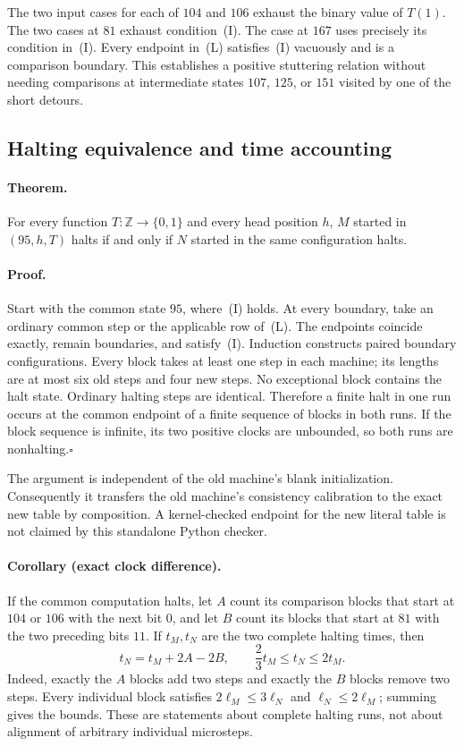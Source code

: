 The two input cases for each of $104$ and $106$ exhaust the binary value
of $T(1)$.  The two cases at $81$ exhaust condition~(I).  The case at $167$
uses precisely its condition in~(I).  Every endpoint in~(L) satisfies~(I)
vacuously and is a comparison boundary.  This establishes a positive
stuttering relation without needing comparisons at intermediate states
$107$, $125$, or $151$ visited by one of the short detours.

\subsection{Halting equivalence and time accounting}

\paragraph{Theorem.}
For every function $T:\mathbb Z\to\{0,1\}$ and every head position $h$,
$M$ started in $(95,h,T)$ halts if and only if $N$ started in the same
configuration halts.

\paragraph{Proof.}
Start with the common state $95$, where~(I) holds.  At every boundary,
take an ordinary common step or the applicable row of~(L).  The endpoints
coincide exactly, remain boundaries, and satisfy~(I).  Induction constructs
paired boundary configurations.  Every block takes at least one step in
each machine; its lengths are at most six old steps and four new steps.
No exceptional block contains the halt state.  Ordinary halting steps
are identical.  Therefore a finite halt in one run occurs at the common
endpoint of a finite sequence of blocks in both runs.  If the block
sequence is infinite, its two positive clocks are unbounded, so both
runs are nonhalting.\hfill$\square$

The argument is independent of the old machine's blank initialization.
Consequently it transfers the old machine's consistency calibration to
the exact new table by composition.  A kernel-checked endpoint for the
new literal table is not claimed by this standalone Python checker.

\paragraph{Corollary (exact clock difference).}
If the common computation halts, let $A$ count its comparison blocks
that start at $104$ or $106$ with the next bit $0$, and let $B$ count its
blocks that start at $81$ with the two preceding bits $11$.  If
$t_M,t_N$ are the two complete halting times, then
\[
 t_N=t_M+2A-2B,
 \qquad \frac23 t_M\leq t_N\leq 2t_M.
\]
Indeed, exactly the $A$ blocks add two steps and exactly the $B$ blocks
remove two steps.  Every individual block satisfies
$2\ell_M\leq3\ell_N$ and $\ell_N\leq2\ell_M$; summing gives the bounds.
These are statements about complete halting runs, not about alignment
of arbitrary individual microsteps.

